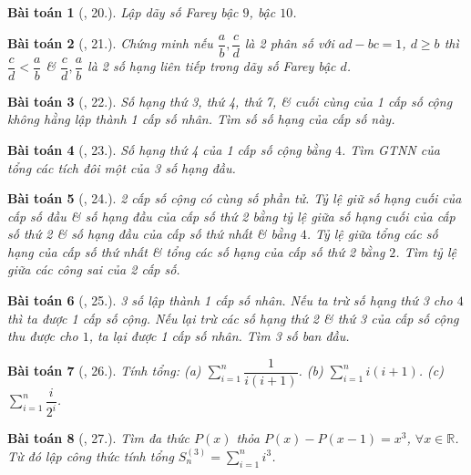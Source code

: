 \documentclass[oneside]{book}
\newtheorem{baitoan}{Bài toán}
\begin{document}
\begin{baitoan}[\cite{TLCT_dai_so_giai_tich_11}, 20.]
	Lập dãy số Farey bậc $9$, bậc $10$.
\end{baitoan}

\begin{baitoan}[\cite{TLCT_dai_so_giai_tich_11}, 21.]
	Chứng minh nếu $\dfrac{a}{b},\dfrac{c}{d}$ là 2 phân số với $ad - bc = 1$, $d\ge b$ thì $\dfrac{c}{d} < \dfrac{a}{b}$ \& $\dfrac{c}{d},\dfrac{a}{b}$ là 2 số hạng liên tiếp trong dãy số Farey bậc $d$.
\end{baitoan}

\begin{baitoan}[\cite{TLCT_dai_so_giai_tich_11}, 22.]
	Số hạng thứ 3, thứ 4, thứ 7, \& cuối cùng của 1 cấp số cộng không hằng lập thành 1 cấp số nhân. Tìm số số hạng của cấp số này.
\end{baitoan}

\begin{baitoan}[\cite{TLCT_dai_so_giai_tich_11}, 23.]
	Số hạng thứ 4 của 1 cấp số cộng bằng $4$. Tìm {\rm GTNN} của tổng các tích đôi một của 3 số hạng đầu.
\end{baitoan}

\begin{baitoan}[\cite{TLCT_dai_so_giai_tich_11}, 24.]
	2 cấp số cộng có cùng số phần tử. Tỷ lệ giữ số hạng cuối của cấp số đầu \& số hạng đầu của cấp số thứ 2 bằng tỷ lệ giữa số hạng cuối của cấp số thứ 2 \& số hạng đầu của cấp số thứ nhất \& bằng $4$. Tỷ lệ giữa tổng các số hạng của cấp số thứ nhất \& tổng các số hạng của cấp số thứ 2 bằng $2$. Tìm tỷ lệ giữa các công sai của 2 cấp số.
\end{baitoan}

\begin{baitoan}[\cite{TLCT_dai_so_giai_tich_11}, 25.]
	3 số lập thành 1 cấp số nhân. Nếu ta trừ số hạng thứ 3 cho $4$  thì ta được 1 cấp số cộng. Nếu lại trừ các số hạng thứ 2 \& thứ 3 của cấp số cộng thu được cho $1$, ta lại được 1 cấp số nhân. Tìm 3 số ban đầu.
\end{baitoan}

\begin{baitoan}[\cite{TLCT_dai_so_giai_tich_11}, 26.]
	Tính tổng: (a) $\sum_{i=1}^n \dfrac{1}{i(i + 1)}$. (b) $\sum_{i=1}^n i(i + 1)$. (c) $\sum_{i=1}^n \dfrac{i}{2^i}$.
\end{baitoan}

\begin{baitoan}[\cite{TLCT_dai_so_giai_tich_11}, 27.]
	Tìm đa thức $P(x)$ thỏa $P(x) - P(x - 1) = x^3$, $\forall x\in\mathbb{R}$. Từ đó lập công thức tính tổng $S_n^{(3)} = \sum_{i=1}^n i^3$.
\end{baitoan}
\end{document}
